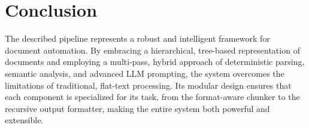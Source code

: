 \documentclass{article}
\begin{document}
\section{Conclusion}
The described pipeline represents a robust and intelligent framework for document automation. By embracing a hierarchical, tree-based representation of documents and employing a multi-pass, hybrid approach of deterministic parsing, semantic analysis, and advanced LLM prompting, the system overcomes the limitations of traditional, flat-text processing. Its modular design ensures that each component is specialized for its task, from the format-aware chunker to the recursive output formatter, making the entire system both powerful and extensible.
\end{document}
